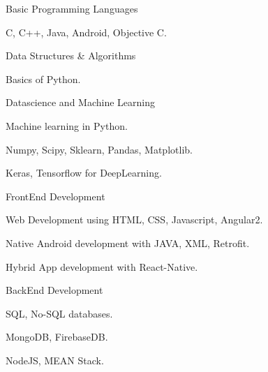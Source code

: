 

\begin{cventries}

  \cventry
    {} %
    {Basic Programming Languages} %
    {} %
    {} %
    {
      \begin{cvitems} %
        \item {C, C++, Java, Android, Objective C.}
        \item {Data Structures \& Algorithms}
        \item{Basics of Python.}
      \end{cvitems}
    }
  \cventry
    {} %
    {Datascience and Machine Learning} %
    {} %
    {} %
    {
      \begin{cvitems} %
        \item {Machine learning in Python.}
        \item {Numpy, Scipy, Sklearn, Pandas, Matplotlib.}
        \item {Keras, Tensorflow for DeepLearning.}
      \end{cvitems}
    }

  \cventry
    {} %
    {FrontEnd Development} %
    {} %
    {} %
    {
      \begin{cvitems} %
        \item {Web Development using HTML, CSS, Javascript, Angular2.}
        \item {Native Android development with JAVA, XML, Retrofit.}
        \item {Hybrid App development with React-Native.}
      \end{cvitems}
    }

  \cventry
    {} %
    {BackEnd Development} %
    {} %
    {} %
    {
      \begin{cvitems} %
        \item {SQL, No-SQL databases.}
        \item {MongoDB, FirebaseDB.}
        \item {NodeJS, MEAN Stack.}
      \end{cvitems}
    }


\end{cventries}
